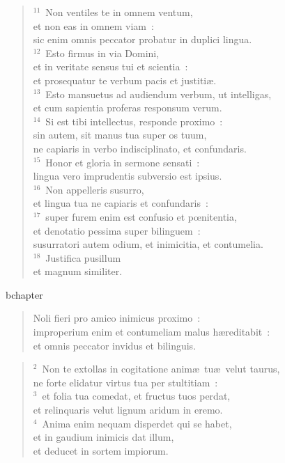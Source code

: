 \begin{verse}${}^{11}$~Non ventiles te in omnem ventum,\\ et non eas in omnem viam~:\\ sic enim omnis peccator probatur in duplici lingua.\\
${}^{12}$~Esto firmus in via Domini,\\ et in veritate sensus tui et scientia~:\\ et prosequatur te verbum pacis et justiti\ae .\\
${}^{13}$~Esto mansuetus ad audiendum verbum, ut intelligas,\\ et cum sapientia proferas responsum verum.\\
${}^{14}$~Si est tibi intellectus, responde proximo~:\\ sin autem, sit manus tua super os tuum,\\ ne capiaris in verbo indisciplinato, et confundaris.\\
${}^{15}$~Honor et gloria in sermone sensati~:\\ lingua vero imprudentis subversio est ipsius.\\
${}^{16}$~Non appelleris susurro,\\ et lingua tua ne capiaris et confundaris~:\\
${}^{17}$~super furem enim est confusio et pœnitentia,\\ et denotatio pessima super bilinguem~:\\ susurratori autem odium, et inimicitia, et contumelia.\\
${}^{18}$~Justifica pusillum\\ et magnum similiter.\end{verse}


bchapter\begin{verse}\vspace{-19pt}Noli fieri pro amico inimicus proximo~:\\ improperium enim et contumeliam malus h\ae reditabit~:\\ et omnis peccator invidus et bilinguis.\end{verse}


\begin{verse}\vspace{6pt}${}^{2}$~Non te extollas in cogitatione anim\ae\ tu\ae\ velut taurus,\\ ne forte elidatur virtus tua per stultitiam~:\\
${}^{3}$~et folia tua comedat, et fructus tuos perdat,\\ et relinquaris velut lignum aridum in eremo.\\
${}^{4}$~Anima enim nequam disperdet qui se habet,\\ et in gaudium inimicis dat illum,\\ et deducet in sortem impiorum.\end{verse}


